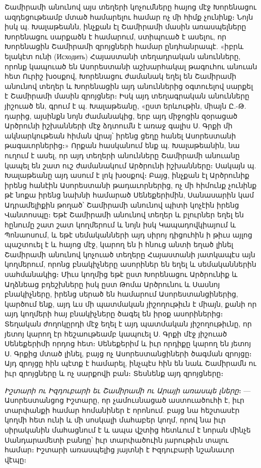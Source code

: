 \documentclass{article}
\begin{document}
{Շամիրամի անունով այս տեղերի կոչումները հայոց մէջ Խորենացու ազդեցութեամբ մտած համարելու համար ոչ մի հիմք չունինք։ Նոյն իսկ պ. Խալաթեանն, ինչքան էլ Շամիրամի մասին առասպելները Խորենացու սարքածն է համարում, ստիպուած է ասելու, որ Խորենացին Շամիրամի զրոյցների համար ընդհանրապէ. «իբրև ելակէտ ունի (Исходить) Հայաստանի տեղադրական անունները, որոնք կապուած են Ասորեստանի աշխարհակալ թագուհու անուան հետ Ուրիշ խօսքով, Խորենացու ժամանակ եղել են Շամիրամի անունով տեղեր և Խորենացին այդ անուններից օգտուելով սարքել է Շամիրամի մասին զրոյցներ։ Իսկ այդ տեղագրական անունները յիշուած են, գրում է պ. Խալաթեանը, «ըստ երևութին, միայն Ը.-Թ. դարից, այսինքն նոյն ժամանակից, երբ այդ միջոցին զօրացած Արծրունի իշխանների մէջ ձդտումն է առաջ գալիս Ս. Գրքի մի ակնարկութեան հիման վրայ՝ իրենց ցեղը հանել Ասորեստանի թագաւորներից։» Որքան հասկանում ենք պ. Խալաթեանին, նա ուղում է ասել, որ այդ տեղերի անունները Շամիրամի անուանը կապել են շատ ուշ ժամանակում Արծրունի իշխանները։ Սակայն պ. Խալաթեանը այդ ասում է լոկ խօսքով։ Բայց, ինչքան էլ Արծրունիք իրենց հանէին Ասորեստանի թադաւորներից, ոչ մի հիմունք չունինք թէ նոքա իրենց նախնի համարած Սենեքերիմին, Սանասարին կամ Ադրամելիքին թողած՝ Շամիրամի անունով պիտի կոչէին իրենց Վանտոսպը։ Եթէ Շամիրամի անունով տեղեր և բլուրներ եղել են հընումը շատ շատ կողմերում և նոյն իսկ Կապադովկիայում և Պոնաոսում, և եթէ սեմականների այդ սիրոյ դիցուհին ի թիւս այլոց պաշտուել է և հայոց մէջ, կարող են ի հնուց անտի եղած լինել Շամիրամի անունով կոչուած տեղերը Հայաստանի յատկապէս այն կողմերում, որոնց բնակիչները ասորիներ են եղել և սեմականներին սահմանակից։ Միւս կողմից եթէ ըստ Խորենացու Արծրունիք և Աղձնեաց բդեշխները իսկ ըստ Թոմա Արծրունու և Սասնոյ բնակիչները, իրենց սերած են համարում Ասորեստանցիներից, կարծում ենք, այդ ևս մի պատմական յիշողութիւն է միայն, քանի որ այդ կողմերի հայ բնակիչները ծագել են իրօք ասորիներից։ Տեղական ժողոկըրդի մէջ եղել է այդ պատմական յիշողութիւնը, որ յետոյ կարող էր հեշաութեամբ կապուել Ս. Գրքի մէջ յիշուած Սենեքերիմի որդոց հետ։ Սենեքերիմ և իւր որդիքը կարող են յետոյ Ս. Գրքից մտած լինել, բայց ոչ Ասորեստանցիների ծագման զրոյցը։ Այդ զրոյցը հին պէտք է համարել, ինչպէս հին են նաև Շամիրամն ու իւր զրոյցները և ոչ սարքովի բան։ Տեսնենք այդ զրոյցները։

\emph{Իշտարի ու Իզդուբարի եւ Շամիրամի ու Արայի առասպե լները}։ — Ասորեստանցոց Իշտարը, որ չամուսնացած աստուածուհի է, իւր տարփանքի համար հոմանիներ է որոնում. բայց նա հեշտասէր կողմի հետ ունի և մի սոսկալի մահաբեր կողմ, որով նա իւր սիրականին մահացնում է և ապա վշտից հետևում է նորան մինչե Սանդարամետի բանղը՝ իւր տարփածուին յարութիւն տալու համար։ Իշտարի առասպելից յայտնի է Իզդուբարի նշանաւոր վէպը։

}
\end{document}
